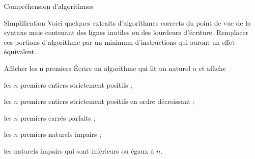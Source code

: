 \begin{Exercice}{Compréhension d'algorithmes}


\end{Exercice}
\bigskip
\bigskip
\begin{Exercice}{Simplification}
	Voici quelques extraits d’algorithmes corrects du point de vue de la
	syntaxe mais contenant des lignes inutiles ou des lourdeurs d’écriture.
	Remplacer ces portions d’algorithme par un minimum d’instructions qui
	auront un effet équivalent.




\end{Exercice}

\begin{Exercice}{Afficher les n premiers}
	Écrire un algorithme qui lit un naturel $n$ et affiche
	
	\begin{liste}
	\item {
	les $n$ premiers entiers strictement positifs ;}
	\item {
	les $n$ premiers entiers strictement positifs en ordre décroissant ;}
	\item {
	les $n$ premiers carrés parfaits ;}
	\item {
	les $n$ premiers naturels impairs ;}
	\item {
	les naturels impairs qui sont inférieurs ou égaux à $n$.}
	\end{liste}
\end{Exercice}

